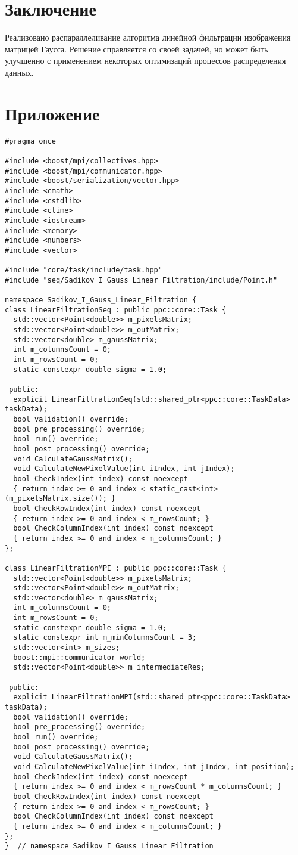 \documentclass[a4paper,14pt]{report}
\begin{document}
\section{Заключение}
Реализовано распараллеливание алгоритма линейной фильтрации изображения матрицей Гаусса. Решение справляется со своей задачей, но может быть улучшенно с применением некоторых оптимизаций процессов распределения данных.
\newpage
\section{Приложение}
\begin{verbatim}
#pragma once

#include <boost/mpi/collectives.hpp>
#include <boost/mpi/communicator.hpp>
#include <boost/serialization/vector.hpp>
#include <cmath>
#include <cstdlib>
#include <ctime>
#include <iostream>
#include <memory>
#include <numbers>
#include <vector>

#include "core/task/include/task.hpp"
#include "seq/Sadikov_I_Gauss_Linear_Filtration/include/Point.h"

namespace Sadikov_I_Gauss_Linear_Filtration {
class LinearFiltrationSeq : public ppc::core::Task {
  std::vector<Point<double>> m_pixelsMatrix;
  std::vector<Point<double>> m_outMatrix;
  std::vector<double> m_gaussMatrix;
  int m_columnsCount = 0;
  int m_rowsCount = 0;
  static constexpr double sigma = 1.0;

 public:
  explicit LinearFiltrationSeq(std::shared_ptr<ppc::core::TaskData> taskData);
  bool validation() override;
  bool pre_processing() override;
  bool run() override;
  bool post_processing() override;
  void CalculateGaussMatrix();
  void CalculateNewPixelValue(int iIndex, int jIndex);
  bool CheckIndex(int index) const noexcept 
  { return index >= 0 and index < static_cast<int>(m_pixelsMatrix.size()); }
  bool CheckRowIndex(int index) const noexcept 
  { return index >= 0 and index < m_rowsCount; }
  bool CheckColumnIndex(int index) const noexcept 
  { return index >= 0 and index < m_columnsCount; }
};

class LinearFiltrationMPI : public ppc::core::Task {
  std::vector<Point<double>> m_pixelsMatrix;
  std::vector<Point<double>> m_outMatrix;
  std::vector<double> m_gaussMatrix;
  int m_columnsCount = 0;
  int m_rowsCount = 0;
  static constexpr double sigma = 1.0;
  static constexpr int m_minColumnsCount = 3;
  std::vector<int> m_sizes;
  boost::mpi::communicator world;
  std::vector<Point<double>> m_intermediateRes;

 public:
  explicit LinearFiltrationMPI(std::shared_ptr<ppc::core::TaskData> taskData);
  bool validation() override;
  bool pre_processing() override;
  bool run() override;
  bool post_processing() override;
  void CalculateGaussMatrix();
  void CalculateNewPixelValue(int iIndex, int jIndex, int position);
  bool CheckIndex(int index) const noexcept 
  { return index >= 0 and index < m_rowsCount * m_columnsCount; }
  bool CheckRowIndex(int index) const noexcept 
  { return index >= 0 and index < m_rowsCount; }
  bool CheckColumnIndex(int index) const noexcept 
  { return index >= 0 and index < m_columnsCount; }
};
}  // namespace Sadikov_I_Gauss_Linear_Filtration
\end{verbatim}
\end{document}
